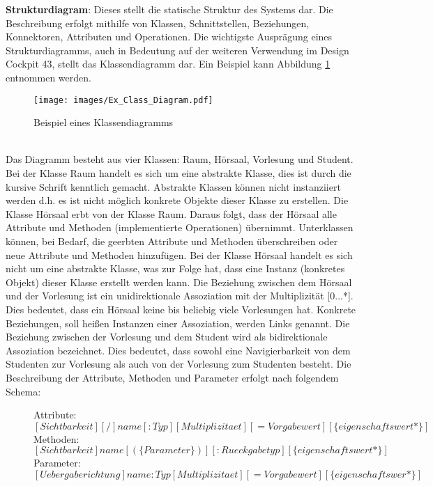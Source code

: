  \textbf{Strukturdiagram}: Dieses stellt die statische Struktur des Systems dar. Die Beschreibung erfolgt mithilfe von Klassen, Schnittstellen, Beziehungen, Konnektoren, Attributen und Operationen. Die wichtigste Ausprägung eines Strukturdiagramms, auch in Bedeutung auf der weiteren Verwendung im Design Cockpit 43\textsuperscript{\textregistered}, stellt das Klassendiagramm dar. Ein Beispiel kann Abbildung \ref{img:Ex_Class_Diagram} entnommen werden.
 \begin{figure}
 	\centering
 	\texttt{[image: images/Ex\_Class\_Diagram.pdf]}
 	\caption{Beispiel eines Klassendiagramms}
 	\label{img:Ex_Class_Diagram}
 \end{figure}\\
Das Diagramm besteht aus vier Klassen: Raum, Hörsaal, Vorlesung und Student. Bei der Klasse Raum handelt es sich um eine abstrakte Klasse, dies ist durch die kursive Schrift kenntlich gemacht. Abstrakte Klassen können nicht instanziiert werden d.h. es ist nicht möglich konkrete Objekte dieser Klasse zu erstellen. Die Klasse Hörsaal erbt von der Klasse Raum. Daraus folgt, dass der Hörsaal alle Attribute und Methoden (implementierte Operationen) übernimmt. Unterklassen können, bei Bedarf, die geerbten Attribute und Methoden überschreiben oder neue Attribute und Methoden hinzufügen. Bei der Klasse Hörsaal handelt es sich nicht um eine abstrakte Klasse, was zur Folge hat, dass eine Instanz (konkretes Objekt) dieser Klasse erstellt werden kann. Die Beziehung zwischen dem Hörsaal und der Vorlesung ist ein unidirektionale Assoziation mit der Multiplizität [0...*]. Dies bedeutet, dass ein Hörsaal keine bis beliebig viele Vorlesungen hat. Konkrete Beziehungen, soll heißen Instanzen einer Assoziation, werden Links genannt. Die Beziehung zwischen der Vorlesung und dem Student wird als bidirektionale Assoziation bezeichnet. Dies bedeutet, dass sowohl eine Navigierbarkeit von dem Studenten zur Vorlesung als auch von der Vorlesung zum Studenten besteht.  Die Beschreibung der Attribute, Methoden und Parameter erfolgt nach folgendem Schema:\\
\begin{figure} [H]
Attribute:\\
$[Sichtbarkeit] [/] name [:Typ] [Multiplizitaet] [=Vorgabewert][\{eigenschaftswert*\}]$\\
Methoden:\\
$[Sichtbarkeit] name [(\{Parameter\})][:Rueckgabetyp][\{eigenschaftswert*\}]$\\
Parameter:\\
$[Uebergaberichtung] name : Typ [Multiplizitaet] [=Vorgabewert][\{eigenschaftswer*\}]$\\
\end{figure}
